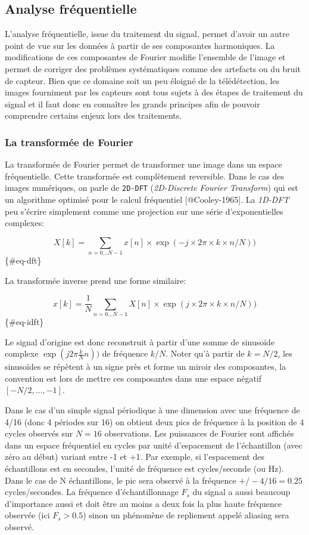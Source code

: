 \documentclass[11pt]{article}
\begin{document}
    \hypertarget{analyse-fruxe9quentielle}{%
\subsection{Analyse fréquentielle}\label{analyse-fruxe9quentielle}}

L'analyse fréquentielle, issue du traitement du signal, permet d'avoir
un autre point de vue sur les données à partir de ses composantes
harmoniques. La modifications de ces composantes de Fourier modifie
l'ensemble de l'image et permet de corriger des problèmes systématiques
comme des artefacts ou du bruit de capteur. Bien que ce domaine soit un
peu éloigné de la télédétection, les images fourniment par les capteurs
sont tous sujets à des étapes de traitement du signal et il faut donc en
connaître les grands principes afin de pouvoir comprendre certains
enjeux lors des traitements.

\hypertarget{la-transformuxe9e-de-fourier}{%
\subsubsection{La transformée de
Fourier}\label{la-transformuxe9e-de-fourier}}

La transformée de Fourier permet de transformer une image dans un espace
fréquentielle. Cette transformée est complètement reversible. Dans le
cas des images numériques, on parle de \texttt{2D-DFT}
(\emph{2D-Discrete Fourier Transform}) qui est un algorithme optimisé
pour le calcul fréquentiel {[}@Cooley-1965{]}. La \emph{1D-DFT} peu
s'écrire simplement comme une projection sur une série d'exponentielles
complexes:

\[X[k] = \sum_{n=0 \ldots N-1} x[n] \times \exp(-j \times 2\pi \times k \times n/N))\]
\{\#eq-dft\}

La transformée inverse prend une forme similaire:

\[x[k] = \frac{1}{N}\sum_{n=0 \ldots N-1} X[n] \times \exp(j \times 2\pi \times k \times n/N))\]
\{\#eq-idft\}

Le signal d'origine est donc reconstruit à partir d'une somme de
sinusoïde complexe \(\exp(j2\pi \frac{k}{N}n))\) de fréquence \(k/N\).
Noter qu'à partir de \(k=N/2\), les sinusoïdes se répètent à un signe
près et forme un miroir des composantes, la convention est lors de
mettre ces composantes dans une espace négatif \([-N/2,\ldots,-1]\).

Dans le cas d'un simple signal périodique à une dimension avec une
fréquence de 4/16 (donc 4 périodes sur 16) on obtient deux pics de
fréquence à la position de 4 cycles observés sur \(N=16\) observations.
Les puissances de Fourier sont affichés dans un espace fréquentiel en
cycles par unité d'espacement de l'échantillon (avec zéro au début)
variant entre -1 et +1. Par exemple, si l'espacement des échantillons
est en secondes, l'unité de fréquence est cycles/seconde (ou Hz). Dans
le cas de N échantillons, le pic sera observé à la fréquence
\(+/- 4/16=0.25\) cycles/secondes. La fréquence d'échantillonnage
\(F_s\) du signal a aussi beaucoup d'importance aussi et doit être au
moins a deux fois la plus haute fréquence observée (ici \(F_s > 0.5\))
sinon un phénomène de repliement appelé aliasing sera observé.
\end{document}
